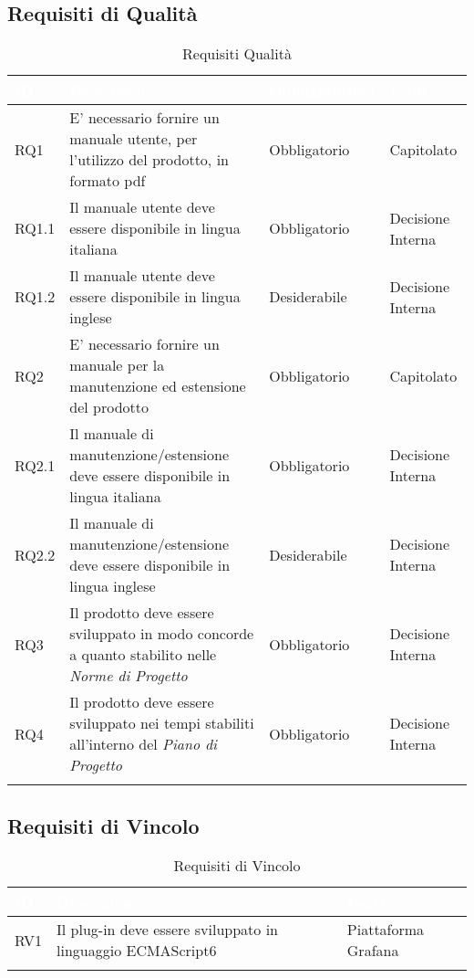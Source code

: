 \subsection{Requisiti di Qualità}\label{RQ}
\begin{center}
\begin{longtable}[c]{|m{}|m{}|m{}|m{}|}
\hline
\rowcolor{bluelogo}\textbf{\textcolor{white}{ID}} & \textbf{\textcolor{white}{Descrizione}} & \textbf{\textcolor{white}{Obbligatorietà}} & \textbf{\textcolor{white}{Fonti}}\\
\hline \hline
\endhead
RQ1 & E' necessario fornire un manuale utente, per l'utilizzo del prodotto, in formato pdf & Obbligatorio & Capitolato\\
\hline
\rowcolor{grigio}RQ1.1 & Il manuale utente deve essere disponibile in lingua italiana & Obbligatorio & Decisione Interna\\
\hline
RQ1.2 & Il manuale utente deve essere disponibile in lingua inglese & Desiderabile & Decisione Interna\\
\hline
\rowcolor{grigio}RQ2 & E' necessario fornire un manuale per la manutenzione ed estensione del prodotto & Obbligatorio & Capitolato\\
\hline
RQ2.1 & Il manuale di manutenzione/estensione deve essere disponibile in lingua italiana & Obbligatorio & Decisione Interna\\
\hline
\rowcolor{grigio}RQ2.2 & Il manuale di manutenzione/estensione deve essere disponibile in lingua inglese & Desiderabile & Decisione Interna\\
\hline
RQ3 & Il prodotto deve essere sviluppato in modo concorde a quanto stabilito nelle \textit{Norme di Progetto} & Obbligatorio & Decisione Interna\\
\hline
\rowcolor{grigio}RQ4 & Il prodotto deve essere sviluppato nei tempi stabiliti all'interno del \textit{Piano di Progetto} & Obbligatorio & Decisione Interna\\
\hline
\caption{Requisiti Qualità}
\end{longtable}
\end{center}

\subsection{Requisiti di Vincolo}\label{RV}
\begin{center}
\begin{longtable}[c]{|m{}|m{}|m{}|}
\hline
\rowcolor{bluelogo}\textbf{\textcolor{white}{ID}} & \textbf{\textcolor{white}{Descrizione}} & \textbf{\textcolor{white}{Fonti}}\\
\hline \hline
\endfirsthead
RV1 & Il plug-in deve essere sviluppato in linguaggio ECMAScript6 & Piattaforma Grafana\\
\hline
\caption{Requisiti di Vincolo}
\end{longtable}
\end{center}


